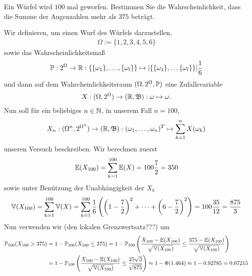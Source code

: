 \begin{exercise}

Ein Würfel wird $100$ mal geworfen. Bestimmen Sie die Wahrscheinlichkeit, dass die Summe der Augenzahlen mehr als $375$ beträgt.

\end{exercise}

\begin{solution}

Wir definieren, um einen Wurf des Würfels darzustellen,
\begin{align*}
    \Omega := \{1,2,3,4,5,6\}
\end{align*}
sowie das Wahrscheinlichkeitsmaß
\begin{align*}
    \P:2^\Omega \to \R: \{\{\omega_1\},\dots,\{\omega_l\}\} \mapsto \vert \{\{\omega_1\},\dots\{\omega_l\}\} \vert \frac{1}{6}
\end{align*}
und dann auf dem Wahrcheinlichkeitsraum $(\Omega,2^\Omega,\P)$ eine Zufallsvariable
\begin{align*}
    X:(\Omega,2^\Omega) \to (\R,\B): \omega \mapsto \omega.
\end{align*}
Nun soll für ein beliebiges $n \in \N$, in unserem Fall $n=100$,
\begin{align*}
    X_n:(\Omega^n,2^{\Omega^n}) \to (\R,\B): (\omega_1,\dots,\omega_n)^T \mapsto \sum_{k=1}^{n} X(\omega_k)
\end{align*}
unseren Versuch beschreiben. Wir berechnen zuerst
\begin{align*}
    \E(X_{100}) = \sum_{k=1}^{100} \E(X) = 100\frac{7}{2} = 350
\end{align*}
sowie unter Benützung der Unabhängigkeit der $X_k$
\begin{align*}
    \V(X_{100}) = \sum_{k=1}^{100} \V(X) = \sum_{k=1}^{100} \frac{1}{6} \pbraces{\pbraces{1-\frac{7}{2}}^2+\cdots+\pbraces{6-\frac{7}{2}}^2} = 100 \frac{35}{12} = \frac{875}{3}
\end{align*}
Nun verwenden wir (den lokalen Grenzwertsatz???) um
\begin{align*}
    \P_{100}(X_{100} > 375) &= 1 - \P_{100}(X_{100} \leq 375) = 1 - \P_{100}\pbraces{\frac{X_{100} - \E(X_{100})}{\sqrt{\V(X_{100})}} \leq \frac{375 - \E(X_{100})}{\sqrt{\V(X_{100})}}} \\
    &= 1 - \P_{100}\pbraces{\frac{X_{100} - \E(X_{100})}{\sqrt{\V(X_{100})}} \leq \frac{25\sqrt{3}}{\sqrt{875}}} \approx 1 - \Phi(1.464) \approx 1 - 0.92785 = 0.07215
\end{align*}
\end{solution}
